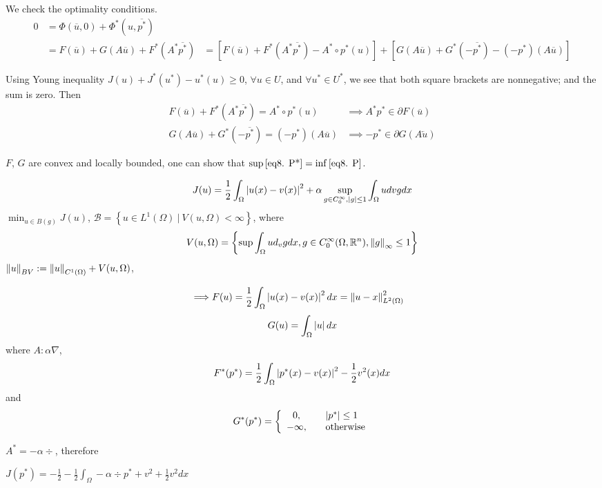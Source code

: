 We check the optimality conditions.
\begin{align*}
	0&=\Phi (\overline{u},0)+\Phi^*(u, \overline{p^*}) \\
	&= F(\overline{u})+G(A\overline{u})+F^*(A^*\overline{p^*})
	&= [F(\overline{u})+F^*(A^*\overline{p^*})-A^*\circ p^*(u)]+[G(A\overline{u})+G^*(-\overline{p^*})-(-p^*)(A\overline{u})]
\end{align*}

Using Young inequality $J(u)+J^*(u^*)-u^*(u)\geq 0$, $\forall u \in U$, and $\forall u^* \in U^*$, we see that both square brackets are nonnegative; and the sum is zero. Then
\begin{align*}
	F(\overline{u})+F^*(A^*\overline{p^*})=A^*\circ p^*(u) &\implies A^*p^* \in \partial F(\overline{u}) \\
	G(A\overline{u})+G^*(-\overline{p^*})=(-p^*)(A\overline{u}) &\implies -p^* \in \partial G(A\overleftarrow{u})
\end{align*}

$F$, $G$ are convex and locally bounded, one can show that 
$\sup\eqref{eq8. P*}=\inf\eqref{eq8. P}$.
\begin{example}
	\begin{equation}
		J(u)=\frac{1}{2} \int_{\Omega}\left|u(x)-v(x)\right|^2+\alpha \sup_{g\in C_0^\infty, \left|g\right|\leq 1} \int_{\Omega} u dv g dx
	\end{equation}
	$\min_{u\in B(g)} J(u)$, $\mathcal{B}=\left\lbrace u\in L^1(\Omega) \ | \ V(u, \Omega) < \infty\right\rbrace$, where
	\begin{equation}
		V(u, \Omega)=\left\lbrace 
		\sup \int_{\Omega} u d_v g dx, g \in C_0^\infty (\Omega, \mathbb{R}^n), \left\lVert g\right\rVert_\infty \leq 1
		\right\rbrace
	\end{equation}
	$\left\lVert u\right\rVert_{BV}:= \left\lVert u\right\rVert_{C^1(\Omega)}+V(u, \Omega)$,
	
	\begin{align*}
		\implies & F(u)=\frac{1}{2}\int_{\Omega} \left|u(x)-v(x)\right|^2 dx = \left\lVert u-x\right\rVert_{L^2(\Omega)}^2
	\end{align*}
	\[G(u)=\int_{\Omega} \left|u\right|dx\]
	 where $A: \alpha \nabla$,
	\begin{align*}
		F^*(p^*)=\frac{1}{2} \int_{\Omega}\left|p^*(x)-v(x)\right| ^2 -\frac{1}{2} v^2(x) dx
	\end{align*}
	and 
	\[G^*(p^*) =\left\lbrace 
	\begin{array}{cl}
		0, &\quad \left|p^*\right| \leq 1 \\
	-\infty, &\quad \text{otherwise}
	\end{array}
	\right. \]
	
	$A^*=-\alpha \div$, therefore
	
	$J(p^*)=-\frac{1}{2} -\frac{1}{2} \int_{\Omega} -\alpha \div p^* + v^2+ \frac{1}{2} v^2 dx$
\end{example}

